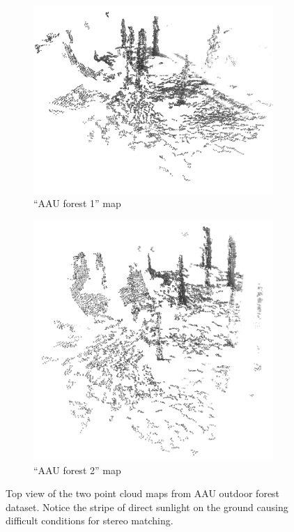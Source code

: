 
\begin{figure}
    \centering
    \begin{subfigure}[b]{0.82\textwidth}
        \includegraphics[width=\textwidth]{../img/aau_fc_dnav5_top.png}
        \caption{``\gls{AAU} forest 1'' map}
    \end{subfigure}
    \begin{subfigure}[b]{0.82\textwidth}
        \includegraphics[width=\textwidth]{../img/aau_fc_dnav6_top.png}
        \caption{``\gls{AAU} forest 2'' map}
    \end{subfigure}
    \caption[Forest point cloud maps -- top view]{Top view of the two point cloud maps from \gls{AAU} outdoor forest dataset. Notice the stripe of direct sunlight on the ground causing difficult conditions for stereo matching.}
    \label{fig:aau_top}
\end{figure}

